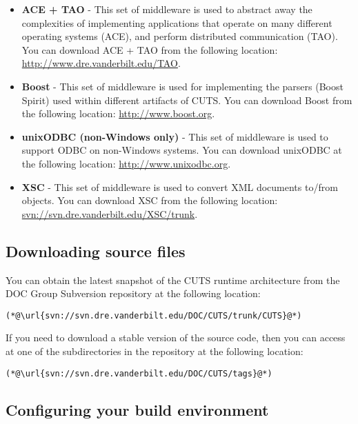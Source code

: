\begin{itemize} 
  \item \textbf{ACE + TAO} - This set of middleware is used to abstract away the 
  complexities of implementing applications that operate on many different operating
  systems (ACE), and perform distributed communication (TAO). You can download ACE + TAO
  from the following location: \url{http://www.dre.vanderbilt.edu/TAO}.

  \item \textbf{Boost} - This set of middleware is used for implementing the parsers 
  (Boost Spirit) used within different artifacts of CUTS. You can download Boost from
  the following location: \url{http://www.boost.org}.

  \item \textbf{unixODBC (non-Windows only)} - This set of middleware is used to  
  support ODBC on non-Windows systems. You can download unixODBC at the following
  location: \url{http://www.unixodbc.org}.

  \item \textbf{XSC} - This set of middleware is used to convert XML documents 
  to/from objects. You can download XSC from the following location: 
  \url{svn://svn.dre.vanderbilt.edu/XSC/trunk}.
\end{itemize}

\subsection{Downloading source files}
\label{sec:install-download-runtime}

You can obtain the latest snapshot of the CUTS runtime architecture from the
DOC Group Subversion repository at the following location:
\begin{lstlisting}
(*@\url{svn://svn.dre.vanderbilt.edu/DOC/CUTS/trunk/CUTS}@*)
\end{lstlisting}
If you need to download a stable version of the source code, then you can 
access at one of the subdirectories in the repository at the following location:
\begin{lstlisting}
(*@\url{svn://svn.dre.vanderbilt.edu/DOC/CUTS/tags}@*)
\end{lstlisting}

\subsection{Configuring your build environment}

